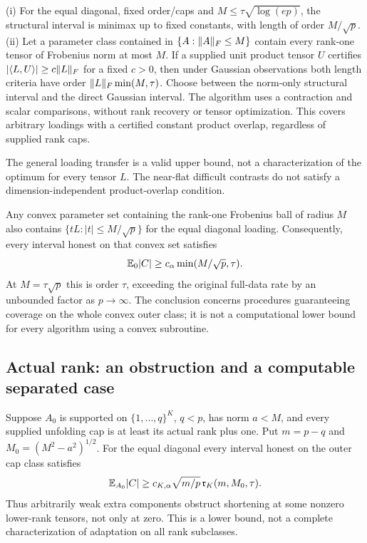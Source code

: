 \begin{theorem}\label{thm:efficient_regimes}
(i) For the equal diagonal, fixed order/caps and $M\le\tau\sqrt{\log(ep)}$, the structural interval is minimax up to fixed constants, with length of order $M/\sqrt p$.
(ii) Let a parameter class contained in $\{A:\lVert A\rVert_F\le M\}$ contain every rank-one tensor of Frobenius norm at most $M$. If a supplied unit product tensor $U$ certifies
$|\langle L,U\rangle|\ge c\lVert L\rVert_F$ for a fixed $c>0$, then under Gaussian observations both length criteria have order $\lVert L\rVert_F\min(M,\tau)$. Choose between the norm-only structural interval and the direct Gaussian interval. The algorithm uses a contraction and scalar comparisons, without rank recovery or tensor optimization. This covers arbitrary loadings with a certified constant product overlap, regardless of supplied rank caps.
\end{theorem}

The general loading transfer is a valid upper bound, not a characterization of the optimum for every tensor $L$. The near-flat difficult contrasts do not satisfy a dimension-independent product-overlap condition.

\begin{proposition}\label{prop:convex_loss}
Any convex parameter set containing the rank-one Frobenius ball of radius $M$ also contains $\{tL:|t|\le M/\sqrt p\}$ for the equal diagonal loading. Consequently, every interval honest on that convex set satisfies
\[
 \mathbb E_0|C|\ge c_\alpha\min(M/\sqrt p,\tau).
\]
At $M=\tau\sqrt p$ this is order $\tau$, exceeding the original full-data rate by an unbounded factor as $p\to\infty$. The conclusion concerns procedures guaranteeing coverage on the whole convex outer class; it is not a computational lower bound for every algorithm using a convex subroutine.
\end{proposition}

\subsection{Actual rank: an obstruction and a computable separated case}

\begin{theorem}\label{thm:shifted_adaptation}
Suppose $A_0$ is supported on $\{1,\ldots,q\}^K$, $q<p$, has norm $a<M$, and every supplied unfolding cap is at least its actual rank plus one. Put $m=p-q$ and $M_0=(M^2-a^2)^{1/2}$. For the equal diagonal every interval honest on the outer cap class satisfies
\[
 \mathbb E_{A_0}|C|\ge c_{K,\alpha}\sqrt{m/p}\,
           \mathfrak r_K(m,M_0,\tau).
\]
Thus arbitrarily weak extra components obstruct shortening at some nonzero lower-rank tensors, not only at zero. This is a lower bound, not a complete characterization of adaptation on all rank subclasses.
\end{theorem}

